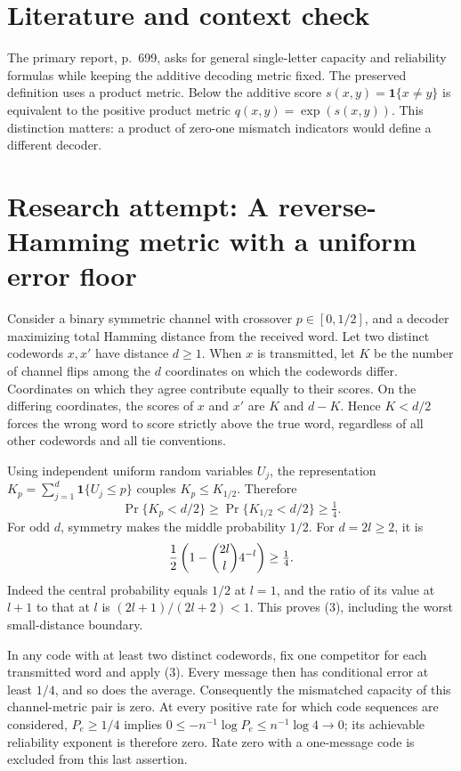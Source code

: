 \documentclass[11pt]{article}
\begin{document}
\section{Literature and context check}
The primary report, p.~699, asks for general single-letter capacity and reliability formulas while keeping the additive decoding metric fixed. The preserved definition uses a product metric. Below the additive score $s(x,y)=\mathbf1\{x\ne y\}$ is equivalent to the positive product metric $q(x,y)=\exp(s(x,y))$. This distinction matters: a product of zero-one mismatch indicators would define a different decoder.
\section{Research attempt: A reverse-Hamming metric with a uniform error floor}
Consider a binary symmetric channel with crossover $p\in[0,1/2]$, and a decoder maximizing total Hamming distance from the received word. Let two distinct codewords $x,x'$ have distance $d\geq1$. When $x$ is transmitted, let $K$ be the number of channel flips among the $d$ coordinates on which the codewords differ. Coordinates on which they agree contribute equally to their scores. On the differing coordinates, the scores of $x$ and $x'$ are $K$ and $d-K$. Hence $K<d/2$ forces the wrong word to score strictly above the true word, regardless of all other codewords and all tie conventions.

Using independent uniform random variables $U_j$, the representation $K_p=\sum_{j=1}^d\mathbf1\{U_j\leq p\}$ couples $K_p\leq K_{1/2}$. Therefore
\[
 \Pr\{K_p<d/2\}\geq\Pr\{K_{1/2}<d/2\}\geq\tfrac14. \tag{3}
\]
For odd $d$, symmetry makes the middle probability $1/2$. For $d=2l\geq2$, it is
\[
 {1\over2}\left(1-\binom{2l}{l}4^{-l}\right)\geq\tfrac14.
\]
Indeed the central probability equals $1/2$ at $l=1$, and the ratio of its value at $l+1$ to that at $l$ is $(2l+1)/(2l+2)<1$. This proves (3), including the worst small-distance boundary.

In any code with at least two distinct codewords, fix one competitor for each transmitted word and apply (3). Every message then has conditional error at least $1/4$, and so does the average. Consequently the mismatched capacity of this channel-metric pair is zero. At every positive rate for which code sequences are considered, $P_e\geq1/4$ implies
$0\leq-n^{-1}\log P_e\leq n^{-1}\log4\to0$; its achievable reliability exponent is therefore zero. Rate zero with a one-message code is excluded from this last assertion.
\end{document}
